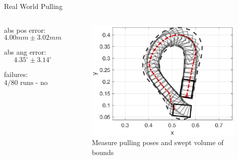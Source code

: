 \documentclass[10pt]{beamer}
\begin{document}
\begin{frame}{Real World Pulling}
  \begin{columns}[c,onlytextwidth]

    \begin{list}{}{
        \setlength{\leftmargin}{0pt}
        \setlength{\labelwidth}{0pt}
        \setlength{\labelsep}{0pt}
      }
    \item abs pos error: 
      \[4.00mm \pm 3.02mm\]
    \item abs ang error: 
      \[4.35^\circ  \pm 3.14^\circ\]
    \item failures:
      \[\text{4/80 runs - no valid plans}\]
    \end{list}


    \begin{figure}
      \begin{center}
        \includegraphics[width=\columnwidth]{fig/trajectory_2.eps}
      \end{center}
      \caption{Measure pulling poses and swept volume of bounds}
    \end{figure}

  \end{columns}
\end{frame}

\end{document}
